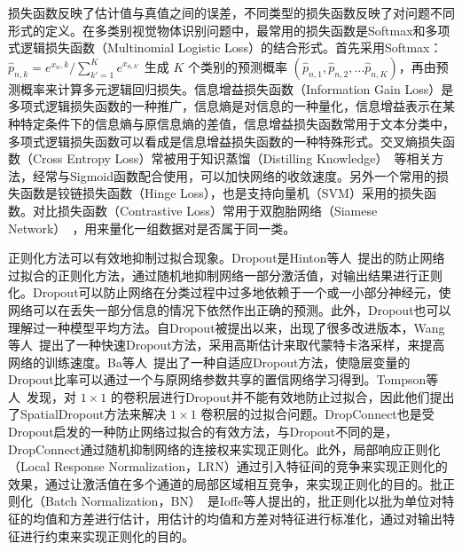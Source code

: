 损失函数反映了估计值与真值之间的误差，不同类型的损失函数反映了对问题不同形式的定义。在多类别视觉物体识别问题中，最常用的损失函数是Softmax和多项式逻辑损失函数（Multinomial Logistic Loss）的结合形式。首先采用Softmax：${\hat{p}}_{n,k}=e^{x_n,k}/\sum_{k'=1}^{K}e^{x_{n,k'}}$ 生成 $K$ 个类别的预测概率 $({\hat{p}}_{n,1}, {\hat{p}}_{n,2}, \dots{\hat{p}}_{n,K})$，再由预测概率来计算多元逻辑回归损失。信息增益损失函数（Information Gain Loss）是多项式逻辑损失函数的一种推广，信息熵是对信息的一种量化，信息增益表示在某种特定条件下的信息熵与原信息熵的差值，信息增益损失函数常用于文本分类中，多项式逻辑损失函数可以看成是信息增益损失函数的一种特殊形式。交叉熵损失函数（Cross Entropy Loss）常被用于知识蒸馏（Distilling Knowledge）~\cite{hinton2015distilling}等相关方法，经常与Sigmoid函数配合使用，可以加快网络的收敛速度。另外一个常用的损失函数是铰链损失函数（Hinge Loss），也是支持向量机（SVM）采用的损失函数。对比损失函数（Contrastive Loss）常用于双胞胎网络（Siamese Network）~\cite{chopra2005learning}，用来量化一组数据对是否属于同一类。

正则化方法可以有效地抑制过拟合现象。Dropout是Hinton等人~\cite{hinton2012improving}提出的防止网络过拟合的正则化方法，通过随机地抑制网络一部分激活值，对输出结果进行正则化。Dropout可以防止网络在分类过程中过多地依赖于一个或一小部分神经元，使网络可以在丢失一部分信息的情况下依然作出正确的预测。此外，Dropout也可以理解过一种模型平均方法。自Dropout被提出以来，出现了很多改进版本，Wang等人~\cite{wang2013fast}提出了一种快速Dropout方法，采用高斯估计来取代蒙特卡洛采样，来提高网络的训练速度。Ba等人~\cite{ba2013adaptive}提出了一种自适应Dropout方法，使隐层变量的Dropout比率可以通过一个与原网络参数共享的置信网络学习得到。Tompson等人~\cite{tompson2015efficient}发现，对 $1{\times}1$ 的卷积层进行Dropout并不能有效地防止过拟合，因此他们提出了SpatialDropout方法来解决 $1{\times}1$ 卷积层的过拟合问题。DropConnect也是受Dropout启发的一种防止网络过拟合的有效方法，与Dropout不同的是，DropConnect通过随机抑制网络的连接权来实现正则化。此外，局部响应正则化（Local Response Normalization，LRN）通过引入特征间的竞争来实现正则化的效果，通过让激活值在多个通道的局部区域相互竞争，来实现正则化的目的。批正则化（Batch Normalization，BN）~\cite{ioffe2015batch}是Ioffe等人提出的，批正则化以批为单位对特征的均值和方差进行估计，用估计的均值和方差对特征进行标准化，通过对输出特征进行约束来实现正则化的目的。


